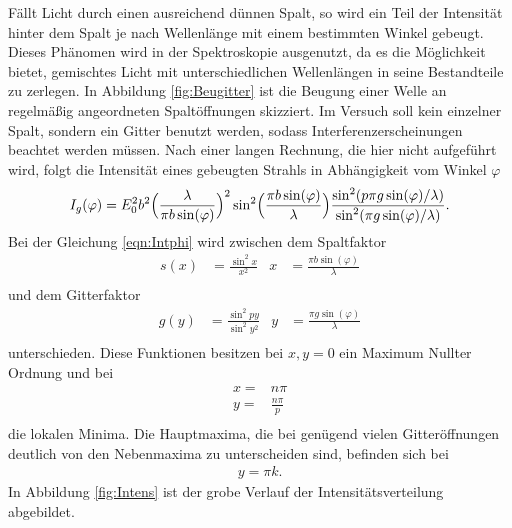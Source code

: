 Fällt Licht durch einen ausreichend dünnen Spalt, so wird ein Teil der
Intensität hinter dem Spalt je nach Wellenlänge mit einem bestimmten Winkel
gebeugt. Dieses Phänomen wird in der Spektroskopie
ausgenutzt, da es die Möglichkeit bietet, gemischtes Licht mit
unterschiedlichen Wellenlängen in seine Bestandteile zu zerlegen.
In Abbildung \ref{fig:Beugitter} ist die Beugung einer
Welle an regelmäßig angeordneten Spaltöffnungen skizziert. Im Versuch soll
kein einzelner Spalt, sondern ein Gitter benutzt werden, sodass
Interferenzerscheinungen beachtet werden müssen.
Nach einer langen Rechnung, die hier nicht aufgeführt wird, folgt die
Intensität eines gebeugten Strahls in Abhängigkeit vom Winkel $\varphi$
\begin{equation}
  I_g(\varphi) = E_0^2 b^2 \Bigl(\frac{\lambda}{\pi b \sin(\varphi)}\Bigr)^2
  \sin^2\Bigl(\frac{\pi b \sin(\varphi)}{\lambda}\Bigr) \frac{\sin^2(p \pi g
  \sin (\varphi)/\lambda)}{\sin^2(\pi g \sin (\varphi)/\lambda)}.
  \label{eqn:Intphi}
\end{equation}
Bei der Gleichung \eqref{eqn:Intphi} wird zwischen dem Spaltfaktor
\begin{align}
  s(x) & = \frac{\sin^2 x}{x^2} & x & = \frac{\pi b \sin(\varphi)}{\lambda} \\
\end{align}
und dem Gitterfaktor
\begin{align}
  g(y) & = \frac{\sin^2 p y}{\sin^2 y^2} & y & = \frac{\pi g \sin(\varphi)}{\lambda} \\
\end{align}
unterschieden.
Diese Funktionen besitzen bei $x,y = 0$ ein Maximum Nullter Ordnung und bei
\begin{align}
  x = & n\pi \\
  y = & \frac{n\pi}{p} \\
\end{align}
die lokalen Minima.
Die Hauptmaxima, die bei genügend vielen Gitteröffnungen deutlich von den
Nebenmaxima zu unterscheiden sind, befinden sich bei
\begin{align}
  y = \pi k.
\end{align}
In Abbildung \ref{fig:Intens} ist der grobe Verlauf der Intensitätsverteilung
abgebildet.

